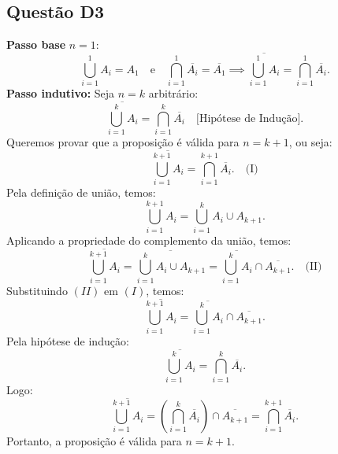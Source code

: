 \documentclass{article}
\begin{document}
\subsection{Questão D3}
\textbf{Passo base} \( n = 1 \):
\[
\bigcup_{i=1}^1 A_i = A_1 \quad \text{e} \quad \bigcap_{i=1}^1 \overline{A_i} = \overline{A_1} \implies \overline{\bigcup_{i=1}^1 A_i} = \bigcap_{i=1}^1 \overline{A_i}.
\]
\textbf{Passo indutivo:}  
Seja \( n = k \) arbitrário:
\[
\overline{\bigcup_{i=1}^k A_i} = \bigcap_{i=1}^k \overline{A_i} \quad \text{[Hipótese de Indução]}.
\]
Queremos provar que a proposição é válida para \( n = k+1 \), ou seja:
\[
\overline{\bigcup_{i=1}^{k+1} A_i} = \bigcap_{i=1}^{k+1} \overline{A_i}. \quad \text{(I)}
\]
Pela definição de união, temos:
\[
\bigcup_{i=1}^{k+1} A_i = \bigcup_{i=1}^k A_i \cup A_{k+1}.
\]
Aplicando a propriedade do complemento da união, temos:
\[
\overline{\bigcup_{i=1}^{k+1} A_i} = \overline{\bigcup_{i=1}^k A_i \cup A_{k+1}} = \overline{\bigcup_{i=1}^k A_i} \cap \overline{A_{k+1}}. \quad \text{(II)}
\]
Substituindo \((II)\) em \((I)\), temos:
\[
\overline{\bigcup_{i=1}^{k+1} A_i} = \overline{\bigcup_{i=1}^k A_i} \cap \overline{A_{k+1}}.
\]
Pela hipótese de indução:
\[
\overline{\bigcup_{i=1}^k A_i} = \bigcap_{i=1}^k \overline{A_i}.
\]
Logo:
\[
\overline{\bigcup_{i=1}^{k+1} A_i} = \left( \bigcap_{i=1}^k \overline{A_i} \right) \cap \overline{A_{k+1}} = \bigcap_{i=1}^{k+1} \overline{A_i}.
\]
Portanto, a proposição é válida para \( n = k+1 \).
\end{document}
